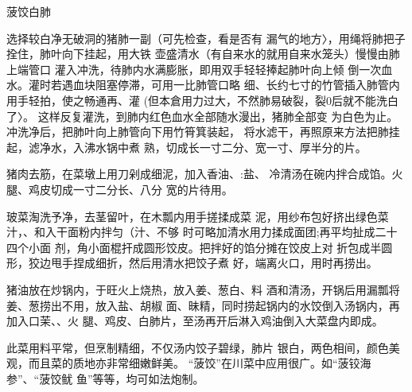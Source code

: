 \begin{recipe}[菠饺银肺]{菠饺白肺}

\ingredients


\cooking

\step 选择较白净无破洞的猪肺一副（可先检查，看是否有 漏气的地方〉，用绳将肺把子拴住，肺叶向下挂起，用大铁 壶盛清水（有自来水的就用自来水笼头）慢慢由肺上端管口 灌入冲洗，待肺内水满膨胀，即用双手轻轻捧起肺叶向上倾 倒一次血水。灌时若遇血块阻塞停滞，可用一比肺管口略 细、长约七寸的竹管插入肺管内用手轻拍，使之畅通再、灌 (但本倉用力过大，不然肺易破裂，裂0后就不能洗白了〉。 这样反复灌洗，到肺内红色血水全部随水漫出，猪肺全部变 为白色为止。冲洗净后，把肺叶向上肺管向下用竹筲箕装起， 将水滤干，再照原来方法把肺挂起，滤净水，入沸水锅中煮 熟，切成长一寸二分、宽一寸、厚半分的片。

\step 猪肉去筋，在菜墩上用刀剁成细泥，加入香油、:盐、 冷清汤在碗内拌合成馅。火腿、鸡皮切成一寸二分长、八分 宽的片待用。

\step 玻菜淘洗予净，去茎留叶，在木瓢内用手搓揉成菜 泥，用纱布包好挤出绿色菜汁，、和入干面粉内拌匀（汁、不够 时可略加清水用力揉成面团;再平均扯成二十四个小面 剂，角小面棍扞成圆形饺皮。把拌好的馅分摊在饺皮上对 折包成半圆形，狡边甩手捏成细折，然后用清水把饺子煮 好，端离火口，用时再捞出。

\step 猪油放在炒锅内，于旺火上烧热，放入姜、葱白、料 酒和清汤，开锅后用漏瓢将姜、葱捞出不用，放入盐、胡椒 面、昧精，同时捞起锅内的水饺倒入汤锅内，再加入口茉、、火 腿、鸡皮、白肺片，至汤再开后淋入鸡油倒入大菜盘内即成。

\notes

此菜用料平常，但烹制精细，不仅汤内饺子碧绿，肺片
银白，两色相间，颜色美观，而且菜的质地亦非常细嫩鲜美。 “菠饺”在川菜中应用很广。如“菠铰海参”、“菠饺鱿 鱼”等等，均可如法炮制。

\end{recipe}

